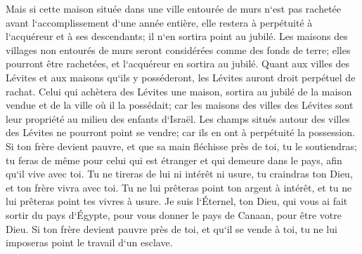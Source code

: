 \verse Mais si cette maison située dans une ville entourée de murs n`est pas rachetée avant l`accomplissement d`une année entière, elle restera à perpétuité à l`acquéreur et à ses descendants; il n`en sortira point au jubilé. 
\verse Les maisons des villages non entourés de murs seront considérées comme des fonds de terre; elles pourront être rachetées, et l`acquéreur en sortira au jubilé. 
\verse Quant aux villes des Lévites et aux maisons qu`ils y posséderont, les Lévites auront droit perpétuel de rachat. 
\verse Celui qui achètera des Lévites une maison, sortira au jubilé de la maison vendue et de la ville où il la possédait; car les maisons des villes des Lévites sont leur propriété au milieu des enfants d`Israël. 
\verse Les champs situés autour des villes des Lévites ne pourront point se vendre; car ils en ont à perpétuité la possession. 
\verse Si ton frère devient pauvre, et que sa main fléchisse près de toi, tu le soutiendras; tu feras de même pour celui qui est étranger et qui demeure dans le pays, afin qu`il vive avec toi. 
\verse Tu ne tireras de lui ni intérêt ni usure, tu craindras ton Dieu, et ton frère vivra avec toi. 
\verse Tu ne lui prêteras point ton argent à intérêt, et tu ne lui prêteras point tes vivres à usure. 
\verse Je suis l`Éternel, ton Dieu, qui vous ai fait sortir du pays d`Égypte, pour vous donner le pays de Canaan, pour être votre Dieu. 
\verse Si ton frère devient pauvre près de toi, et qu`il se vende à toi, tu ne lui imposeras point le travail d`un esclave. 
